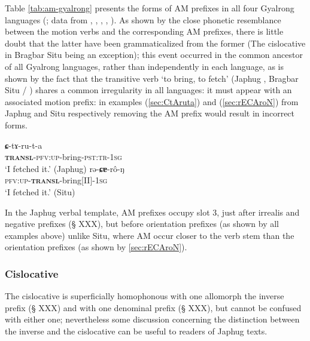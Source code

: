 Table \ref{tab:am-gyalrong} presents the forms of AM prefixes in all four Gyalrong languages (\citealt{jacques19am-st}; data from \citealt{jacques13harmonization}, \citealt{gong18these}, \citealt{jackson14morpho}, \citealt[200-204]{zhang16bragdbar}, \citealt[497-500]{prins16kyomkyo}). As shown by the close phonetic resemblance between the motion verbs and the corresponding AM prefixes, there is little doubt that the latter have been grammaticalized from the former (The cislocative  in Bragbar Situ being an exception); this event occurred in the common ancestor of all Gyalrong languages, rather than independently in each language, as is shown by the fact that the transitive verb `to bring, to fetch' (Japhug , Bragbar Situ  / ) shares a common irregularity in all languages: it must appear with an associated motion prefix: in examples (\ref{sec:CtAruta}) and (\ref{sec:rECAroN}) from Japhug and Situ respectively removing the AM prefix would result in incorrect forms.

\begin{exe}
 \ex  \label{sec:CtAruta}
 \gll  \textbf{ɕ}-tɤ-ru-t-a  \\
 \textbf{\textsc{transl}}-\textsc{pfv}:\textsc{up}-bring-\textsc{pst}:\textsc{tr}-1\textsc{sg} \\
 \glt `I fetched it.' (Japhug)
 \ex  \label{sec:rECAroN}
 \gll   rə-\textbf{ɕɐ}-rô-ŋ  \\
\textsc{pfv}:\textsc{up}-\textbf{\textsc{transl}}-bring[II]-1\textsc{sg} \\
\glt `I fetched it.' (Situ)
\end{exe}

In the Japhug verbal template, AM prefixes occupy slot 3, just after irrealis and negative prefixes (§ XXX), but before orientation prefixes (as shown by all examples above) unlike Situ, where AM occur closer to the verb stem than the orientation prefixes (as shown by \ref{sec:rECAroN}).

\subsubsection{Cislocative} \label{sec:cislocative.morpho}
The cislocative  is superficially homophonous with one allomorph the inverse prefix  (§ XXX) and with one denominal prefix (§ XXX), but cannot be confused with either one; nevertheless some discussion concerning the distinction between the inverse and the cislocative can be useful to readers of Japhug texts.

